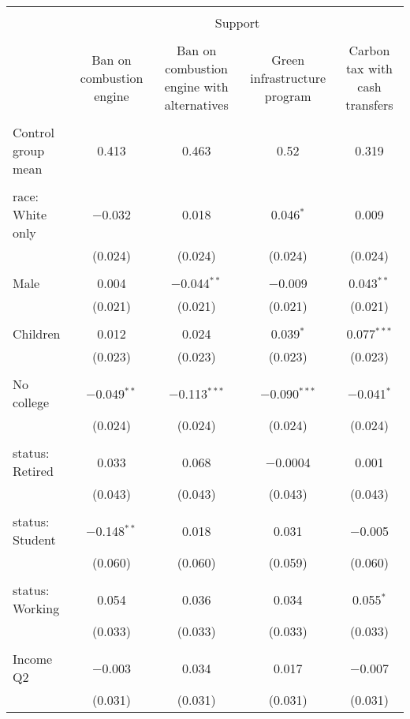 
\begin{tabular}{@{\extracolsep{5pt}}lcccc} 
\\[-1.8ex]\hline 
\hline \\[-1.8ex] 
 & \multicolumn{4}{c}{Support} \\ 
\cline{2-5} 
\\[-1.8ex] & Ban on combustion engine & Ban on combustion engine with alternatives & Green infrastructure program & Carbon tax with cash transfers \\ 
\hline \\[-1.8ex] 
 Control group mean & 0.413 & 0.463 & 0.52 & 0.319  \\ \hline \\[-1.8ex] race: White only & $-$0.032 & 0.018 & 0.046$^{*}$ & 0.009 \\ 
  & (0.024) & (0.024) & (0.024) & (0.024) \\ 
  & & & & \\ 
 Male & 0.004 & $-$0.044$^{**}$ & $-$0.009 & 0.043$^{**}$ \\ 
  & (0.021) & (0.021) & (0.021) & (0.021) \\ 
  & & & & \\ 
 Children & 0.012 & 0.024 & 0.039$^{*}$ & 0.077$^{***}$ \\ 
  & (0.023) & (0.023) & (0.023) & (0.023) \\ 
  & & & & \\ 
 No college & $-$0.049$^{**}$ & $-$0.113$^{***}$ & $-$0.090$^{***}$ & $-$0.041$^{*}$ \\ 
  & (0.024) & (0.024) & (0.024) & (0.024) \\ 
  & & & & \\ 
 status: Retired & 0.033 & 0.068 & $-$0.0004 & 0.001 \\ 
  & (0.043) & (0.043) & (0.043) & (0.043) \\ 
  & & & & \\ 
 status: Student & $-$0.148$^{**}$ & 0.018 & 0.031 & $-$0.005 \\ 
  & (0.060) & (0.060) & (0.059) & (0.060) \\ 
  & & & & \\ 
 status: Working & 0.054 & 0.036 & 0.034 & 0.055$^{*}$ \\ 
  & (0.033) & (0.033) & (0.033) & (0.033) \\ 
  & & & & \\ 
 Income Q2 & $-$0.003 & 0.034 & 0.017 & $-$0.007 \\ 
  & (0.031) & (0.031) & (0.031) & (0.031) \\ 

\end{tabular}
